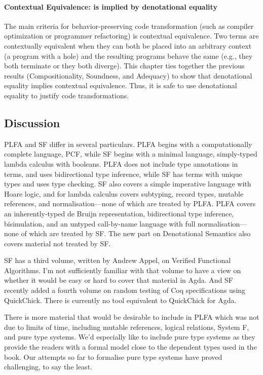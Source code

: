 \documentclass[preprint,authoryear]{elsarticle}
\begin{document}
\paragraph{Contextual Equivalence: is implied by denotational equality}
The main criteria for behavior-preserving code transformation (such as
compiler optimization or programmer refactoring) is contextual
equivalence. Two terms are contextually equivalent when they can both
be placed into an arbitrary context (a program with a hole) and the
resulting programs behave the same (e.g., they both terminate or they
both diverge). This chapter ties together the previous results
(Compositionality, Soundness, and Adequacy) to show that denotational
equality implies contextual equivalence. Thus, it is safe to use
denotational equality to justify code transformations.


\subsection*{Discussion}

PLFA and SF differ in several particulars.  PLFA begins with a computationally
complete language, PCF, while SF begins with a minimal language, simply-typed
lambda calculus with booleans.  PLFA does not include type annotations in terms,
and uses bidirectional type inference, while SF has terms with unique types and
uses type checking.  SF also covers a simple imperative language with Hoare
logic, and for lambda calculus covers subtyping, record types, mutable
references, and normalisation---none of which are treated by PLFA.  PLFA covers
an inherently-typed de Bruijn representation, bidirectional type inference,
bisimulation, and an untyped call-by-name language with full
normalisation---none of which are treated by SF.  The new part on
Denotational Semantics also covers material not treated by SF.

SF has a third volume, written by Andrew Appel, on Verified Functional
Algorithms. I'm not sufficiently familiar with that volume to have a view on
whether it would be easy or hard to cover that material in Agda. And SF recently
added a fourth volume on random testing of Coq specifications using QuickChick.
There is currently no tool equivalent to QuickChick for Agda.

There is more material that would be desirable to include in PLFA which was not
due to limits of time, including mutable references, logical relations, System F, and
pure type systems. We'd especially like to include pure type systems as they
provide the readers with a formal model close to the dependent types used in the
book.  Our attempts so far to formalise pure type systems have proved
challenging, to say the least.
\end{document}
